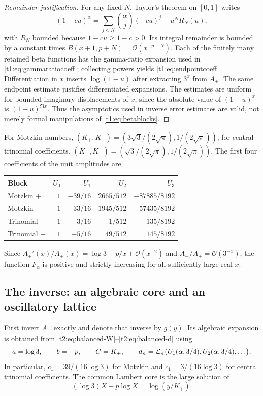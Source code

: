 \documentclass[11pt,openany]{book}
\numberwithin{equation}{chapter}
\theoremstyle{plain}
\theoremstyle{definition}
\theoremstyle{remark}
\newcommand{\OO}{\mathcal O}\newcommand{\bigO}{\mathcal O}
\begin{document}
\begin{proof}[Remainder justification]
For any fixed $N$, Taylor's theorem on $[0,1]$ writes
\[
 (1-cu)^\alpha=\sum_{j<N}\binom\alpha j(-cu)^j+u^N R_N(u),
\]
with $R_N$ bounded because $1-cu\ge1-c>0$. Its integral remainder is bounded by a constant times $B(x+1,p+N)=\OO(x^{-p-N})$. Each of the finitely many retained beta functions has the gamma-ratio expansion used in \eqref{t1:eq:gammaratiocoeff}; collecting powers yields \eqref{t1:eq:endpointcoeff}. Differentiation in $x$ inserts $\log(1-u)$ after extracting $3^x$ from $A_+$. The same endpoint estimate justifies differentiated expansions. The estimates are uniform for bounded imaginary displacements of $x$, since the absolute value of $(1-u)^x$ is $(1-u)^{\Re x}$. Thus the asymptotics used in inverse error estimates are valid, not merely formal manipulations of \eqref{t1:eq:betablocks}.
\end{proof}

For Motzkin numbers, $(K_+,K_-)=(3\sqrt3/(2\sqrt\pi),1/(2\sqrt\pi))$; for central trinomial coefficients, $(K_+,K_-)=(\sqrt3/(2\sqrt\pi),1/(2\sqrt\pi))$. The first four coefficients of the unit amplitudes are
\begin{center}
\begin{tabular}{@{}lrrrr@{}}
\toprule
Block & $U_0$ & $U_1$ & $U_2$ & $U_3$\\
\midrule
Motzkin $+$ & $1$ & $-39/16$ & $2665/512$ & $-87885/8192$\\
Motzkin $-$ & $1$ & $-33/16$ & $1945/512$ & $-57435/8192$\\
Trinomial $+$ & $1$ & $-3/16$ & $1/512$ & $135/8192$\\
Trinomial $-$ & $1$ & $-5/16$ & $49/512$ & $145/8192$\\
\bottomrule
\end{tabular}
\end{center}
Since $A_+'(x)/A_+(x)=\log3-p/x+\OO(x^{-2})$ and $A_-/A_+=\OO(3^{-x})$, the function $F_\alpha$ is positive and strictly increasing for all sufficiently large real $x$.

\subsection{The inverse: an algebraic core and an oscillatory lattice}
First invert $A_+$ exactly and denote that inverse by $g(y)$. Its algebraic expansion is obtained from \eqref{t2:eq:balanced-W}--\eqref{t2:eq:balanced-d} using
\begin{equation}
 a=\log3,\qquad b=-p,\qquad C=K_+,\qquad
 d_n=\mathcal L_n\bigl(U_1(\alpha,3/4),U_2(\alpha,3/4),\ldots\bigr).
 \label{t1:eq:endpointinverseparams}
\end{equation}
In particular, $c_1=39/(16\log3)$ for Motzkin and $c_1=3/(16\log3)$ for central trinomial coefficients. The common Lambert core is the large solution of
\[
 (\log3)X-p\log X=\log(y/K_+).
\]
\end{document}
